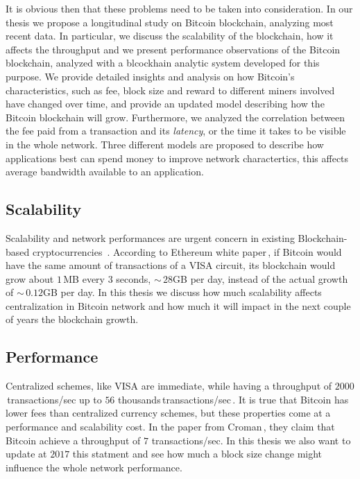\documentclass[USenglish]{uit-thesis}
\begin{document}
It is obvious then that these problems need to be taken
into consideration.
In our thesis we propose a longitudinal study on Bitcoin blockchain,
analyzing most recent data.
In particular, we discuss the scalability of the blockchain, how it affects
the throughput and we present performance observations of the
Bitcoin blockchain, analyzed with a blcockhain analytic system developed
for this purpose. We provide detailed insights and analysis on how
Bitcoin's characteristics, such as fee, block size and reward to different
miners involved have changed over time, and provide an
updated model describing how the Bitcoin blockchain will grow.
Furthermore, we analyzed the
correlation between the fee paid from a transaction
and its \emph{latency}, or the time it takes to 
be visible in the whole network.
Three different models are proposed to describe how applications
best can spend money to improve network charactertics,
this affects average bandwidth available to an application. 

\subsection{Scalability}
\label{sec:prob_stat_scalability}
Scalability and network performances are urgent
concern in existing Blockchain-based
cryptocurrencies~\cite{croman2016}.
According to Ethereum white paper\,\cite{ethereum_white_paper},
if Bitcoin would have the same amount of transactions
of a VISA circuit, its blockchain would grow
about $1$\,MB every $3$ seconds, $\sim$\,$28$GB per day,
instead of the actual growth of $\sim$\,$0.12$GB per day.
In this thesis we discuss how much scalability affects
centralization in Bitcoin network and how much it will
impact in the next couple of years the blockchain
growth.

\subsection{Performance}
Centralized schemes, like VISA are immediate, while having a
throughput of $2000$\,transactions/sec
up to $56$ thousands\,transactions/sec\,\cite{croman2016}.
It is true that Bitcoin has lower fees than centralized
currency schemes, but these properties
come at a performance and scalability cost.
In the paper from Croman\,\cite{croman2016}, they
claim that Bitcoin achieve a throughput of $7$ transactions/sec.
In this thesis we also want to update at $2017$ this statment
and see how much a block size change might
influence the whole network performance.
\end{document}
